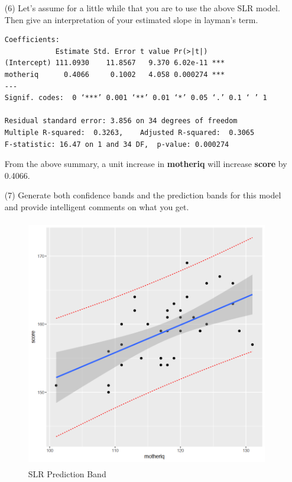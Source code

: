 \documentclass[12pt,a4paper]{article}
\begin{document}
\begin{enumerate}
\item[(6)] Let’s assume for a little while that you are to use the above SLR model. Then give an interpretation of your estimated slope in layman’s term.\\
\begin{verbatim}
Coefficients:
            Estimate Std. Error t value Pr(>|t|)    
(Intercept) 111.0930    11.8567   9.370 6.02e-11 ***
motheriq      0.4066     0.1002   4.058 0.000274 ***
---
Signif. codes:  0 ‘***’ 0.001 ‘**’ 0.01 ‘*’ 0.05 ‘.’ 0.1 ‘ ’ 1

Residual standard error: 3.856 on 34 degrees of freedom
Multiple R-squared:  0.3263,	Adjusted R-squared:  0.3065 
F-statistic: 16.47 on 1 and 34 DF,  p-value: 0.000274
\end{verbatim}
From the above summary,  a unit increase in \textbf{motheriq} will increase  \textbf{score} by 0.4066.
\item[(7)] Generate both confidence bands and the prediction bands for this model and provide intelligent comments on what you get.\\
			\begin{figure}[!h]
				\includegraphics[width=420pt,height=310pt]{./graphics/q47.png}
				\caption{SLR Prediction Band}
				\label{fig:06}
		\end{figure}
		

\end{enumerate}
\end{document}
